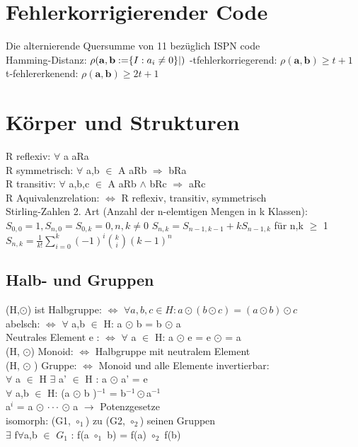 \documentclass[]{article}
\begin{document}
\section{Fehlerkorrigierender Code}
Die alternierende Quersumme von 11 bezüglich ISPN code\\
Hamming-Distanz: $\rho(\mathbf{a,b}:= \set{I:a_i\neq0}|)$
-tfehlerkorriegerend: $\rho(\mathbf{a,b}) \geq t+1$\\
t-fehlererkenend: $\rho(\mathbf{a,b}) \geq 2t+1$
\section{Körper und Strukturen}
R reflexiv: $\forall$ a aRa \\
R symmetrisch: $\forall$ a,b $\in$ A   aRb $\Rightarrow$ bRa \\
R transitiv: $\forall$ a,b,c $\in$ A aRb $\land$ bRc $\Rightarrow$ aRc \\
R Aquivalenzrelation: $\Leftrightarrow$ R reflexiv, transitiv, symmetrisch \\

Stirling-Zahlen 2. Art (Anzahl der n-elemtigen Mengen in k Klassen): 
$S_{0,0}=1 , S_{n,0}=S_{0,k}=0, n,k \neq 0$
$S_{n,k} = S_{n-1,k-1} + kS_{n-1,k}  $ f\"ur n,k $\geq$ 1 
$S_{n,k}= \frac{1}{k!} \sum_{i=0}^k (-1)^i \binom{k}{i} (k-1)^n$

\subsection{Halb- und Gruppen}
(H,$\odot$) ist Halbgruppe: $\Leftrightarrow$ $\forall a,b,c \in H: a \odot (b \odot c) = (a \odot b) \odot c $ \\
abelsch: $\Leftrightarrow$ $\forall$ a,b $\in$ H: a $\odot$ b = b $\odot$ a \\
Neutrales Element e :  $\Leftrightarrow$ $\forall$ a $\in$ H: a $\odot$ e = e $\odot$ = a \\
(H, $\odot$) Monoid: $\Leftrightarrow$ Halbgruppe mit neutralem Element \\
(H, $\odot$ ) Gruppe: $\Leftrightarrow$ Monoid und alle Elemente invertierbar:\\ $\forall$ a $\in$ H $\exists$ a' $\in$ H : a $\odot$ a' = e  \\
$\forall$ a,b $\in$ H: 
(a $\odot$ b )$^{-1}$ = b$^{-1} \odot $a$^{-1}$\\
a$^i$ = a $\odot$ $\cdot \cdot \cdot$ $\odot$ a $\rightarrow$ Potenzgesetze \\
isomorph: (G1, $\circ_1$) zu (G2, $\circ_2$) seinen Gruppen\\
$\exists$ f$\forall$a,b $\in$ $G_1$ : f(a $\circ_1$ b) = f(a) $\circ_2$ f(b)  
\end{document}
